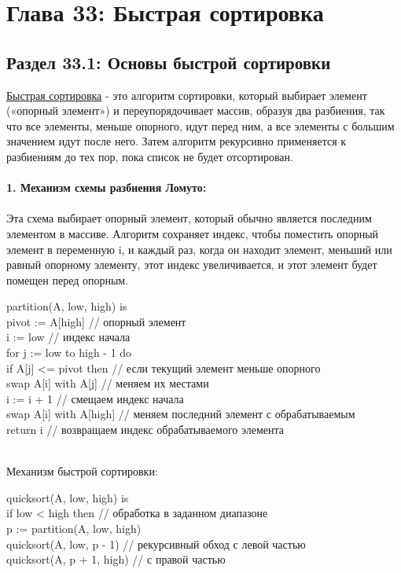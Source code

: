 \newpage
\chapter*{Глава 33: Быстрая сортировка}
\section*{Раздел 33.1: Основы быстрой сортировки}
\href{https://en.wikipedia.org/wiki/Quicksort}{\underline{{Быстрая сортировка}}} - это алгоритм сортировки, который выбирает элемент («опорный элемент») и переупорядочивает массив, образуя два разбиения, так что все элементы, меньше опорного, идут перед ним, а все элементы с большим значением идут после него. Затем алгоритм рекурсивно применяется к разбиениям до тех пор, пока список не будет отсортирован.\\
\\
\textbf{1. Механизм схемы разбиения Ломуто:}\\
\\
Эта схема выбирает опорный элемент, который обычно является последним элементом в массиве. Алгоритм сохраняет индекс, чтобы поместить опорный элемент в переменную i, и каждый раз, когда он находит элемент, меньший или равный опорному элементу, этот индекс увеличивается, и этот элемент будет помещен перед опорным.
\begin{tcolorbox}[breakable,enhanced,before upper={\parindent10pt}]
\noindent partition(A, low, high) is\\
pivot := A[high] // опорный элемент\\
i := low // индекс начала\\
for j := low to high - 1 do\\
\indent if A[j] <= pivot then // если текущий элемент меньше опорного\\
\indent\indent swap A[i] with A[j] // меняем их местами\\
\indent\indent i := i + 1 // смещаем индекс начала\\
swap A[i] with A[high]  // меняем последний элемент с обрабатываемым\\
return i // возвращаем индекс обрабатываемого элемента\\
\end{tcolorbox}
\\
Механизм быстрой сортировки:
\begin{tcolorbox}[breakable,enhanced,before upper={\parindent10pt}]
\noindent quicksort(A, low, high) is\\
if low < high then // обработка в заданном диапазоне\\
\indent p := partition(A, low, high) \\
\indent quicksort(A, low, p - 1) // рекурсивный обход с левой частью\\
\indent quicksort(A, p + 1, high) // с правой частью\\
\end{tcolorbox}
